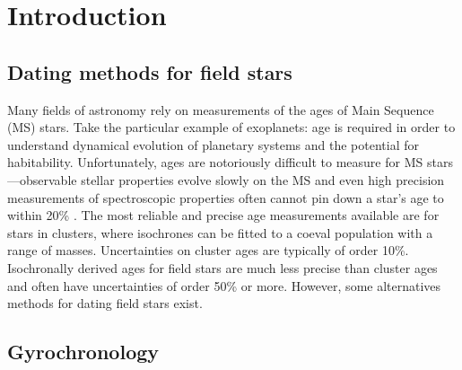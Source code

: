 \documentclass[10pt,preprint]{aastex}
\begin{document}
\section{Introduction}
\label{intro}
\subsection{Dating methods for field stars}

Many fields of astronomy rely on measurements of the ages of Main Sequence (MS) stars.
Take the particular example of exoplanets: age is required in order to understand dynamical evolution of planetary systems and the potential for habitability.
Unfortunately, ages are notoriously difficult to measure for MS stars---observable stellar properties evolve slowly on the MS and even high precision measurements of spectroscopic properties often cannot pin down a star's age to within 20\% \citep{Soderblom2010}.
The most reliable and precise age measurements available are for stars in clusters, where isochrones can be fitted to a coeval population with a range of masses.
Uncertainties on cluster ages are typically of order 10\%.
Isochronally derived ages for field stars are much less precise than cluster ages and often have uncertainties of order 50\% or more.
However, some alternatives methods for dating field stars exist.


\subsection{Gyrochronology}
\end{document}
